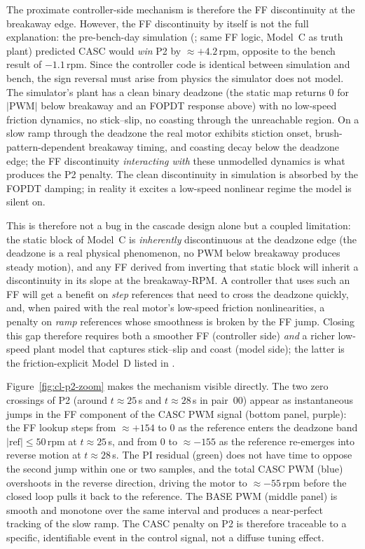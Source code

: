 The proximate controller-side mechanism is therefore the FF discontinuity at the breakaway edge. However, the FF discontinuity by itself is not the full explanation: the pre-bench-day simulation (; same FF logic, Model~C as truth plant) predicted CASC would \emph{win} P2 by ${\approx}{+}4.2$\,rpm, opposite to the bench result of ${-}1.1$\,rpm. Since the controller code is identical between simulation and bench, the sign reversal must arise from physics the simulator does not model. The simulator's plant has a clean binary deadzone (the static map returns 0 for $|\text{PWM}|$ below breakaway and an FOPDT response above) with no low-speed friction dynamics, no stick--slip, no coasting through the unreachable region. On a slow ramp through the deadzone the real motor exhibits stiction onset, brush-pattern-dependent breakaway timing, and coasting decay below the deadzone edge; the FF discontinuity \emph{interacting with} these unmodelled dynamics is what produces the P2 penalty. The clean discontinuity in simulation is absorbed by the FOPDT damping; in reality it excites a low-speed nonlinear regime the model is silent on.

This is therefore not a bug in the cascade design alone but a coupled limitation: the static block of Model~C is \emph{inherently} discontinuous at the deadzone edge (the deadzone is a real physical phenomenon, no PWM below breakaway produces steady motion), and any FF derived from inverting that static block will inherit a discontinuity in its slope at the breakaway-RPM. A controller that uses such an FF will get a benefit on \emph{step} references that need to cross the deadzone quickly, and, when paired with the real motor's low-speed friction nonlinearities, a penalty on \emph{ramp} references whose smoothness is broken by the FF jump. Closing this gap therefore requires both a smoother FF (controller side) \emph{and} a richer low-speed plant model that captures stick--slip and coast (model side); the latter is the friction-explicit Model~D listed in .

Figure~\ref{fig:cl-p2-zoom} makes the mechanism visible directly. The two zero crossings of P2 (around $t \approx 25$\,s and $t \approx 28$\,s in pair~00) appear as instantaneous jumps in the FF component of the CASC PWM signal (bottom panel, purple): the FF lookup steps from ${\approx}{+}154$ to $0$ as the reference enters the deadzone band $|\text{ref}|\le 50$\,rpm at $t \approx 25$\,s, and from $0$ to ${\approx}{-}155$ as the reference re-emerges into reverse motion at $t \approx 28$\,s. The PI residual (green) does not have time to oppose the second jump within one or two samples, and the total CASC PWM (blue) overshoots in the reverse direction, driving the motor to ${\approx}{-}55$\,rpm before the closed loop pulls it back to the reference. The BASE PWM (middle panel) is smooth and monotone over the same interval and produces a near-perfect tracking of the slow ramp. The CASC penalty on P2 is therefore traceable to a specific, identifiable event in the control signal, not a diffuse tuning effect.

